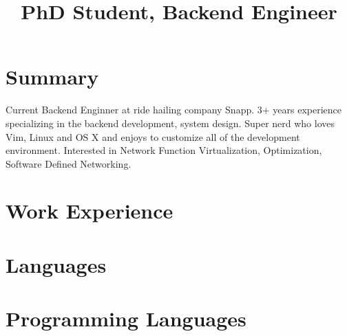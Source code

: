 \documentclass[11pt, a4paper, color, final]{moderncv}
\title{PhD Student, Backend Engineer}
\begin{document}
\maketitle

\section{Summary}\closesection{}
Current Backend Enginner at ride hailing company Snapp.
3+ years experience specializing in the backend development, system design.
Super nerd who loves Vim, Linux and OS X and enjoys to customize all of the development environment.
Interested in Network Function Virtualization, Optimization, Software Defined Networking.


\section{Work Experience}

\section{Languages}

\section{Programming Languages}
\end{document}
